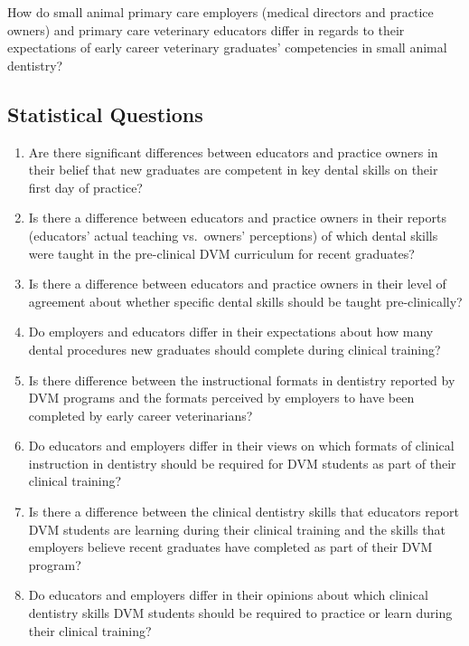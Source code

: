 \documentclass[
  11pt,
  letterpaper,
  DIV=11,
  numbers=noendperiod]{scrartcl}
\numberwithin{figure}{section}
\begin{document}
How do small animal primary care employers (medical directors and
practice owners) and primary care veterinary educators differ in regards
to their expectations of early career veterinary graduates' competencies
in small animal dentistry?

\subsection{Statistical Questions}\label{statistical-questions}

\begin{enumerate}
\def\labelenumi{\arabic{enumi}.}
\item
  Are there significant differences between educators and practice
  owners in their belief that new graduates are competent in key dental
  skills on their first day of practice?
\item
  Is there a difference between educators and practice owners in their
  reports (educators' actual teaching vs.~owners' perceptions) of which
  dental skills were taught in the pre-clinical DVM curriculum for
  recent graduates?
\item
  Is there a difference between educators and practice owners in their
  level of agreement about whether specific dental skills should be
  taught pre-clinically?
\item
  Do employers and educators differ in their expectations about how many
  dental procedures new graduates should complete during clinical
  training?
\item
  Is there difference between the instructional formats in dentistry
  reported by DVM programs and the formats perceived by employers to
  have been completed by early career veterinarians?
\item
  Do educators and employers differ in their views on which formats of
  clinical instruction in dentistry should be required for DVM students
  as part of their clinical training?
\item
  Is there a difference between the clinical dentistry skills that
  educators report DVM students are learning during their clinical
  training and the skills that employers believe recent graduates have
  completed as part of their DVM program?
\item
  Do educators and employers differ in their opinions about which
  clinical dentistry skills DVM students should be required to practice
  or learn during their clinical training?
\end{enumerate}
\end{document}
